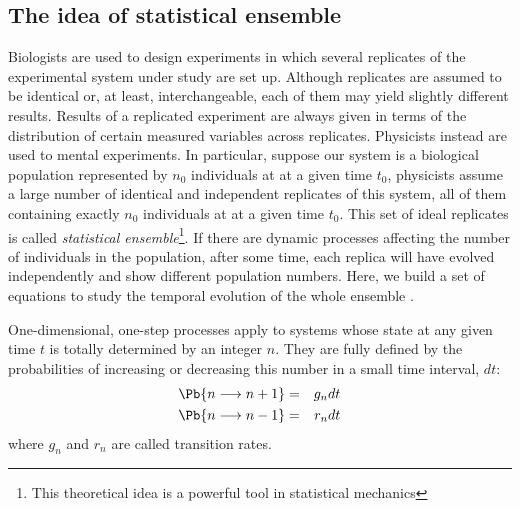 \subsection{The idea of statistical ensemble}
\label{master_equation}
Biologists are used to design experiments in which several replicates of the experimental system under study are set up. Although replicates are assumed to be identical or, at least, interchangeable, each of them may yield slightly different results. Results of a replicated experiment are always given in terms of the distribution of certain measured variables across replicates. Physicists instead are used to mental experiments. In particular, suppose our system is a biological population represented by $n_0$ individuals at at a given time $t_0$, physicists assume a large number of identical and independent replicates of this system, all of them containing exactly $n_0$ individuals at at a given time $t_0$. This set of ideal replicates is called {\em statistical ensemble}\footnote{This theoretical idea is a powerful tool in statistical mechanics}. If there are dynamic processes affecting the number of individuals in the population, after some time, each replica will have evolved independently and show different population numbers. Here, we build a set of equations to study the temporal evolution of the whole ensemble \citep{Allen87}. 
\smallskip

One-dimensional, one-step processes apply to systems whose state at any given time $t$ is totally determined by an integer $n$. They are fully defined by the probabilities of increasing or decreasing this number in a small time interval, $dt$:
\begin{eqnarray}
\Pb\{ n \longrightarrow n+1 \} & = & g_n dt \nonumber\\
\Pb\{ n \longrightarrow n-1 \} & = & r_n dt
\label{eq:pb}
\end{eqnarray}
where $g_n$ and $r_n$ are called transition rates. 
\smallskip

